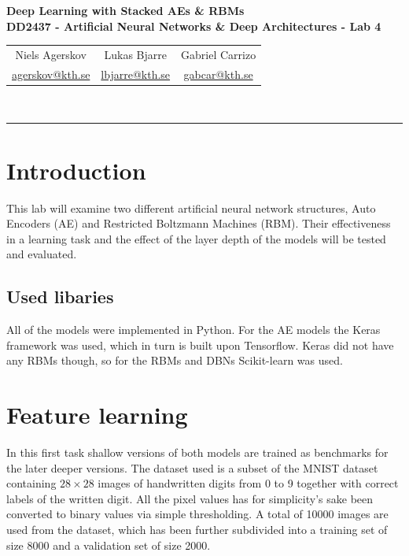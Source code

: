 \documentclass{article}
\newcommand{\mail}[1]{
  \href{mailto:#1}{#1}
}
\begin{document}
\begin{center}
  \textbf{
    \LARGE Deep Learning with Stacked AEs \& RBMs \\
    \vspace{.5ex}
    \large DD2437 - Artificial Neural Networks \& Deep Architectures - Lab 4\\
    \vspace{1ex}
  }
  \large
  \begin{tabular}{ccc}
    Niels Agerskov & Lukas Bjarre & Gabriel Carrizo \\
    \mail{agerskov@kth.se} & \mail{lbjarre@kth.se} & \mail{gabcar@kth.se}
  \end{tabular}
  \\
  \vspace{.5ex}
  \rule{\textwidth}{0.4pt}
\end{center}

\section{Introduction}
This lab will examine two different artificial neural network structures,
Auto Encoders (AE) and Restricted Boltzmann Machines (RBM).
Their effectiveness in a learning task 
and the effect of the layer depth of the models
will be tested and evaluated.

\subsection{Used libaries}
All of the models were implemented in Python.
For the AE models the Keras framework \cite{keras} was used,
which in turn is built upon Tensorflow.
Keras did not have any RBMs though,
so for the RBMs and DBNs Scikit-learn \cite{sklearn} was used.

\section{Feature learning}
In this first task shallow versions of both models are trained
as benchmarks for the later deeper versions.
The dataset used is a subset of the MNIST dataset
containing $28 \times 28$ images of handwritten digits from 0 to 9
together with correct labels of the written digit.
All the pixel values has for simplicity's sake been converted to binary values
via simple thresholding.
A total of 10000 images are used from the dataset,
which has been further subdivided into a training set of size 8000 and a validation set of size 2000.
\end{document}
